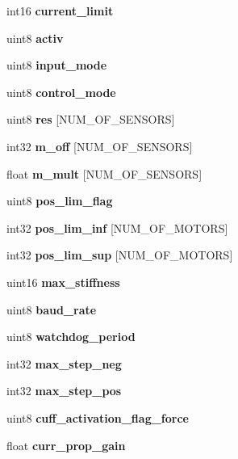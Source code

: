 \begin{DoxyCompactItemize}
int16 {\bfseries current\+\_\+limit}
\item 
\mbox{\label{structst__mem_a63bbebc1db55f43e0571006597a3488b}} 
uint8 {\bfseries activ}
\item 
\mbox{\label{structst__mem_ae5cc8b2ae06016f1fcf5b2f964618a12}} 
uint8 {\bfseries input\+\_\+mode}
\item 
\mbox{\label{structst__mem_af0c55b7d870673f2f6e9521c215d4b51}} 
uint8 {\bfseries control\+\_\+mode}
\item 
\mbox{\label{structst__mem_ac2e19d167eac4c8ca9ce97c646e78595}} 
uint8 {\bfseries res} [N\+U\+M\+\_\+\+O\+F\+\_\+\+S\+E\+N\+S\+O\+RS]
\item 
\mbox{\label{structst__mem_ab544f035124be893918bafb611fe88d9}} 
int32 {\bfseries m\+\_\+off} [N\+U\+M\+\_\+\+O\+F\+\_\+\+S\+E\+N\+S\+O\+RS]
\item 
\mbox{\label{structst__mem_aecf0baab567443534c0ded663b746896}} 
float {\bfseries m\+\_\+mult} [N\+U\+M\+\_\+\+O\+F\+\_\+\+S\+E\+N\+S\+O\+RS]
\item 
\mbox{\label{structst__mem_aa2ceebf7546e978c8b0393ce8035532d}} 
uint8 {\bfseries pos\+\_\+lim\+\_\+flag}
\item 
\mbox{\label{structst__mem_a631265c712a620e03d9233634e1819a2}} 
int32 {\bfseries pos\+\_\+lim\+\_\+inf} [N\+U\+M\+\_\+\+O\+F\+\_\+\+M\+O\+T\+O\+RS]
\item 
\mbox{\label{structst__mem_a818808d7c324999701b5aad40a8fabca}} 
int32 {\bfseries pos\+\_\+lim\+\_\+sup} [N\+U\+M\+\_\+\+O\+F\+\_\+\+M\+O\+T\+O\+RS]
\item 
\mbox{\label{structst__mem_aa20cd7437de72c537fd6bb84c158d51e}} 
uint16 {\bfseries max\+\_\+stiffness}
\item 
\mbox{\label{structst__mem_a1a2b3002580421effeca67955a862580}} 
uint8 {\bfseries baud\+\_\+rate}
\item 
\mbox{\label{structst__mem_a1aae70aad54a04c7b41a8d2dcd7aba14}} 
uint8 {\bfseries watchdog\+\_\+period}
\item 
\mbox{\label{structst__mem_a14fe3ed96d232dced2d33efc493a0667}} 
int32 {\bfseries max\+\_\+step\+\_\+neg}
\item 
\mbox{\label{structst__mem_a9be5987152b8c6bb28c1d311bc94e5e3}} 
int32 {\bfseries max\+\_\+step\+\_\+pos}
\item 
\mbox{\label{structst__mem_a2d82e812af843168450b031020f165d1}} 
uint8 {\bfseries cuff\+\_\+activation\+\_\+flag\+\_\+force}
\item 
\mbox{\label{structst__mem_a7d09555c03c9da9fd8817bb338b72f81}} 
float {\bfseries curr\+\_\+prop\+\_\+gain}

\end{DoxyCompactItemize}
